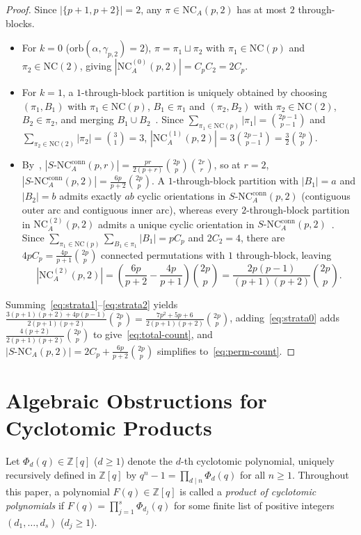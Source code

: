 \documentclass[11pt,a4paper]{article}
\theoremstyle{definition}
\theoremstyle{remark}
\newcommand{\NCA}{\mathrm{NC}_A}
\newcommand{\SNCA}{S\text{-}\mathrm{NC}_A}
\newcommand{\NC}{\mathrm{NC}}
\newcommand{\orb}{\mathrm{orb}}
\begin{document}
\begin{proof}
Since $|\{p+1,p+2\}| = 2$, any $\pi \in \NCA(p,2)$ has at most $2$ through-blocks.
\begin{itemize}
  \item For $k = 0$ ($\orb(\alpha,\gamma_{p,2}) = 2$), $\pi = \pi_1 \sqcup \pi_2$ with $\pi_1 \in \NC(p)$ and $\pi_2 \in \NC(2)$, giving $|\NCA^{(0)}(p,2)| = C_p C_2 = 2 C_p$.
  \item For $k = 1$, a $1$-through-block partition is uniquely obtained by choosing $(\pi_1, B_1)$ with $\pi_1 \in \NC(p)$, $B_1 \in \pi_1$ and $(\pi_2, B_2)$ with $\pi_2 \in \NC(2)$, $B_2 \in \pi_2$, and merging $B_1 \cup B_2$~\cite[Proposition~6.2]{MingoNica2004}. Since $\sum_{\pi_1 \in \NC(p)} |\pi_1| = \binom{2p-1}{p-1}$ and $\sum_{\pi_2 \in \NC(2)} |\pi_2| = \binom{3}{1} = 3$, $|\NCA^{(1)}(p,2)| = 3\binom{2p-1}{p-1} = \frac{3}{2}\binom{2p}{p}$.
  \item By~\cite[Corollary~4.5]{MingoNica2004}, $|\SNCA^{\mathrm{conn}}(p,r)| = \frac{pr}{2(p+r)}\binom{2p}{p}\binom{2r}{r}$, so at $r = 2$, $|\SNCA^{\mathrm{conn}}(p,2)| = \frac{6p}{p+2}\binom{2p}{p}$. A $1$-through-block partition with $|B_1| = a$ and $|B_2| = b$ admits exactly $ab$ cyclic orientations in $\SNCA^{\mathrm{conn}}(p,2)$ (contiguous outer arc and contiguous inner arc), whereas every $2$-through-block partition in $\NCA^{(2)}(p,2)$ admits a unique cyclic orientation in $\SNCA^{\mathrm{conn}}(p,2)$~\cite[Proposition~6.3]{MingoNica2004}. Since $\sum_{\pi_1 \in \NC(p)} \sum_{B_1 \in \pi_1} |B_1| = p C_p$ and $2 C_2 = 4$, there are $4p C_p = \frac{4p}{p+1}\binom{2p}{p}$ connected permutations with $1$ through-block, leaving
  \[
    |\NCA^{(2)}(p,2)| = \left(\frac{6p}{p+2} - \frac{4p}{p+1}\right)\binom{2p}{p}
    = \frac{2p(p-1)}{(p+1)(p+2)}\binom{2p}{p}.
  \]
\end{itemize}
Summing~\eqref{eq:strata1}--\eqref{eq:strata2} yields $\frac{3(p+1)(p+2) + 4p(p-1)}{2(p+1)(p+2)}\binom{2p}{p} = \frac{7p^2 + 5p + 6}{2(p+1)(p+2)}\binom{2p}{p}$, adding~\eqref{eq:strata0} adds $\frac{4(p+2)}{2(p+1)(p+2)}\binom{2p}{p}$ to give~\eqref{eq:total-count}, and $|\SNCA(p,2)| = 2 C_p + \frac{6p}{p+2}\binom{2p}{p}$ simplifies to~\eqref{eq:perm-count}.
\end{proof}

\section{Algebraic Obstructions for Cyclotomic Products}

Let $\Phi_d(q) \in \mathbb{Z}[q]$ ($d \ge 1$) denote the $d$-th cyclotomic polynomial, uniquely recursively defined in $\mathbb{Z}[q]$ by $q^n - 1 = \prod_{d \mid n} \Phi_d(q)$ for all $n \ge 1$. Throughout this paper, a polynomial $F(q) \in \mathbb{Z}[q]$ is called a \emph{product of cyclotomic polynomials} if $F(q) = \prod_{j=1}^s \Phi_{d_j}(q)$ for some finite list of positive integers $(d_1,\dots,d_s)$ ($d_j \ge 1$).
\end{document}
